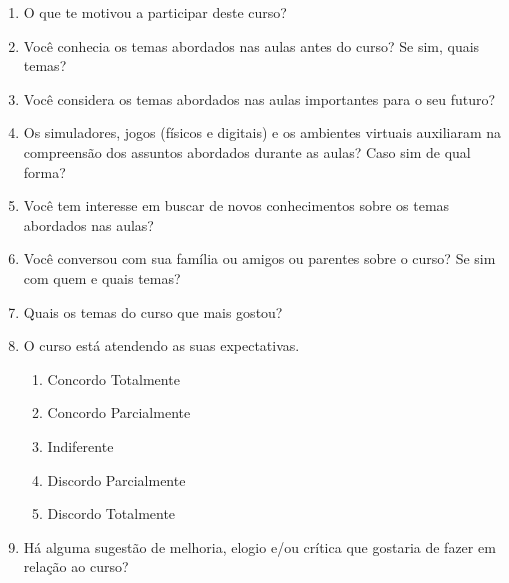 \begin{enumerate}
    \item O que te motivou a participar deste curso?
    
    \item Você conhecia os temas abordados nas aulas antes do curso? Se sim, quais temas?
    
    \item Você considera os temas abordados nas aulas importantes para o seu futuro?
    
    \item Os simuladores, jogos (físicos e digitais) e os ambientes virtuais auxiliaram na compreensão dos assuntos abordados durante as aulas? Caso sim de qual forma?
    
    \item Você tem interesse em buscar de novos conhecimentos sobre os temas abordados nas aulas?
    
    \item Você conversou com sua família ou amigos ou parentes sobre o curso? Se sim com quem e quais temas?
    
    \item Quais os temas do curso que mais gostou?
    
    \item O curso está atendendo as suas expectativas.
        \begin{enumerate}
            \item Concordo Totalmente
            \item Concordo Parcialmente
            \item Indiferente
            \item Discordo Parcialmente
            \item Discordo Totalmente
        \end{enumerate}
    
    \item Há alguma sugestão de melhoria, elogio e/ou crítica que gostaria de fazer em relação ao curso?
\end{enumerate}